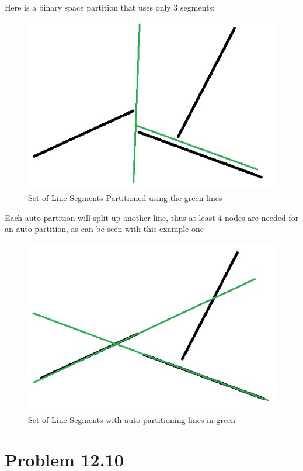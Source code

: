 \documentclass[11pt,psfig]{article}
\begin{document}
Here is a binary space partition that uses only 3 segments:
\begin{figure}[H]
\centering
\includegraphics[height=3in]{hw6prob3diagram2.jpg}
\caption{Set of Line Segments Partitioned using the green lines}
\end{figure}

Each auto-partition will split up another line, thus at least 4 nodes are needed for an auto-partition, as can be seen with this example one
\begin{figure}[H]
\centering
\includegraphics[height=3in]{hw6prob3diagram3.jpg}
\caption{Set of Line Segments with auto-partitioning lines in green}
\end{figure}

\section*{Problem 12.10}

\end{document}
